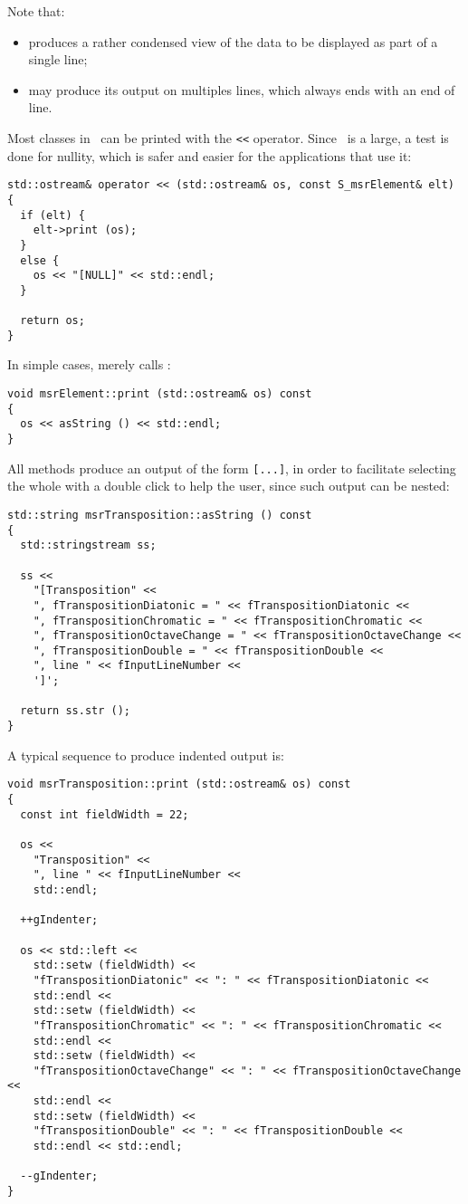 Note that:
\begin{itemize}
\item {} produces a rather condensed view of the data to be displayed as part of a single line;
\item {} may produce its output on multiples lines, which always ends with an end of line.
\end{itemize}

Most classes in \mf\ can be printed with the {\tt <<} operator. Since \mf\ is a large, a test is done for nullity, which is safer and easier for the applications that use it:
\begin{lstlisting}[language=CPlusPlus]
std::ostream& operator << (std::ostream& os, const S_msrElement& elt)
{
  if (elt) {
    elt->print (os);
  }
  else {
    os << "[NULL]" << std::endl;
  }

  return os;
}
\end{lstlisting}

In simple cases,  merely calls :
\begin{lstlisting}[language=CPlusPlus]
void msrElement::print (std::ostream& os) const
{
  os << asString () << std::endl;
}
\end{lstlisting}

All  methods produce an output of the form {\tt [...]}, in order to facilitate selecting the whole with a double click to help the user, since such output can be nested:
\begin{lstlisting}[language=CPlusPlus]
std::string msrTransposition::asString () const
{
  std::stringstream ss;

  ss <<
    "[Transposition" <<
    ", fTranspositionDiatonic = " << fTranspositionDiatonic <<
    ", fTranspositionChromatic = " << fTranspositionChromatic <<
    ", fTranspositionOctaveChange = " << fTranspositionOctaveChange <<
    ", fTranspositionDouble = " << fTranspositionDouble <<
    ", line " << fInputLineNumber <<
    ']';

  return ss.str ();
}
\end{lstlisting}

A typical sequence to produce indented output is:
\begin{lstlisting}[language=CPlusPlus]
void msrTransposition::print (std::ostream& os) const
{
  const int fieldWidth = 22;

  os <<
    "Transposition" <<
    ", line " << fInputLineNumber <<
    std::endl;

  ++gIndenter;

  os << std::left <<
    std::setw (fieldWidth) <<
    "fTranspositionDiatonic" << ": " << fTranspositionDiatonic <<
    std::endl <<
    std::setw (fieldWidth) <<
    "fTranspositionChromatic" << ": " << fTranspositionChromatic <<
    std::endl <<
    std::setw (fieldWidth) <<
    "fTranspositionOctaveChange" << ": " << fTranspositionOctaveChange <<
    std::endl <<
    std::setw (fieldWidth) <<
    "fTranspositionDouble" << ": " << fTranspositionDouble <<
    std::endl << std::endl;

  --gIndenter;
}
\end{lstlisting}

